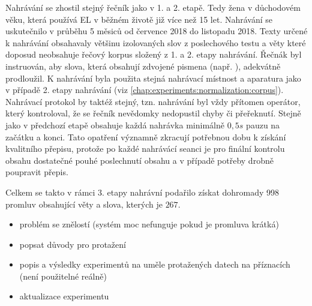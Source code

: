 Nahrávání se zhostil stejný řečník jako v 1. a 2. etapě. Tedy žena v důchodovém věku, která používá EL v běžném životě již více než 15 let. Nahrávání se uskutečnilo v průběhu 5 měsiců od července 2018 do listopadu 2018. Texty určené k nahrávání obsahavaly většinu izolovaných slov z poslechového testu a věty které doposud neobsahuje řečový korpus složený z 1. a 2. etapy nahrávání. Řečnák byl instruován, aby slova, která obsahují zdvojené pismena (např. ), adekvátně prodloužil. K nahrávání byla použita stejná nahrávací místnost a aparatura jako v případě 2. etapy nahrávání (viz \ref{chap:experiments:normalization:corpus}). Nahrávací protokol by taktéž stejný, tzn. nahrávání byl vždy přítomen operátor, který kontroloval, že se řečník nevědomky nedopustil chyby či přeřeknutí. Stejně jako v předchozí etapě obsahuje každá nahrávka minimálně $0,5 s$ pauzu na začátku a konci. Tato opatření významně zkracují potřebnou dobu k získání kvalitního přepisu, protože po každé nahrávácí seanci je pro finální kontrolu obsahu dostatečné pouhé poslechnutí obsahu a v případě potřeby drobně poupravit přepis.

Celkem se takto v rámci 3. etapy nahrávní podařilo získat dohromady 998 promluv obsahující věty a slova, kterých je $267$.

\begin{itemize}
  \item problém se znělostí (systém moc nefunguje pokud je promluva krátká)
  \item popsat důvody pro protažení
  \item popis a výsledky experimentů na uměle protažených datech na příznacích (není použitelné reálně)
  \item aktualizace experimentu 
\end{itemize}
